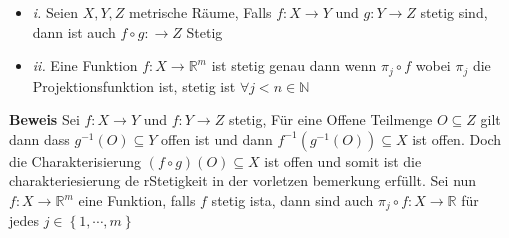 \documentclass{article}
\begin{document}
\begin{itemize}
  \item{\textit{i.} Seien $X,Y,Z$ metrische Räume, Falls $f:X\rightarrow Y$ und $g:Y\rightarrow Z$ stetig sind, dann ist auch $f\circ g:\rightarrow Z$ Stetig}
  \item{\textit{ii.} Eine Funktion $f:X\rightarrow \mathbb{R}^m$ ist stetig genau dann wenn $\pi_j\circ f$ wobei $\pi_j$ die Projektionsfunktion ist, stetig ist $\forall j<n\in \mathbb{N}$}
\end{itemize}
\textbf{Beweis} Sei $f:X\rightarrow Y$ und $f:Y\rightarrow Z$ stetig, Für eine Offene Teilmenge $O\subseteq Z$ gilt dann dass $g^{-1}(O)\subseteq Y$ offen ist und dann $f^{-1}(g^{-1}(O))\subseteq X$ ist offen. Doch die Charakterisierung $(f\circ g)(O)\subseteq X$ ist offen und somit ist die charakteriesierung de rStetigkeit in der vorletzen bemerkung erfüllt.
\newline Sei nun $f:X\rightarrow \mathbb{R}^m$ eine Funktion, falls $f$ stetig ista, dann sind auch $\pi_j\circ f:X\rightarrow \mathbb{R}$ für jedes $j\in \left\lbrace 1,\cdots,m\right\rbrace$
\end{document}
